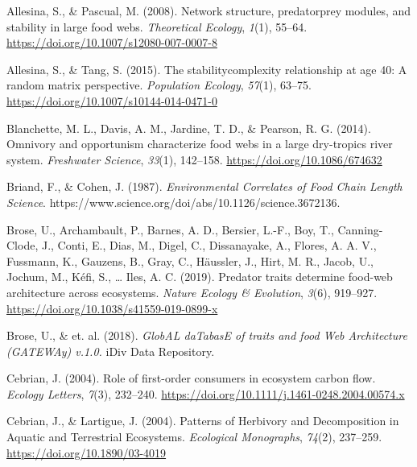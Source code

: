 \documentclass[
]{article}
\newlength{\cslhangindent}
\newlength{\cslentryspacingunit} %
\newenvironment{CSLReferences}[2] %
 {%
  \setlength{\parindent}{0pt}
  \ifodd #1
  \let\oldpar\par
  \def\par{\hangindent=\cslhangindent\oldpar}
  \fi
  \setlength{\parskip}{#2\cslentryspacingunit}
 }%
 {}
\begin{document}
\hypertarget{refs}{}
\begin{CSLReferences}{1}{0}
\leavevmode{}%
Allesina, S., \& Pascual, M. (2008). Network structure,
predator\textendash prey modules, and stability in large food webs.
\emph{Theoretical Ecology}, \emph{1}(1), 55--64.
\url{https://doi.org/10.1007/s12080-007-0007-8}

\leavevmode{}%
Allesina, S., \& Tang, S. (2015). The stability\textendash complexity
relationship at age 40: A random matrix perspective. \emph{Population
Ecology}, \emph{57}(1), 63--75.
\url{https://doi.org/10.1007/s10144-014-0471-0}

\leavevmode{}%
Blanchette, M. L., Davis, A. M., Jardine, T. D., \& Pearson, R. G.
(2014). Omnivory and opportunism characterize food webs in a large
dry-tropics river system. \emph{Freshwater Science}, \emph{33}(1),
142--158. \url{https://doi.org/10.1086/674632}

\leavevmode{}%
Briand, F., \& Cohen, J. (1987). \emph{Environmental {Correlates} of
{Food Chain Length} \textbar{} {Science}}.
https://www.science.org/doi/abs/10.1126/science.3672136.

\leavevmode{}%
Brose, U., Archambault, P., Barnes, A. D., Bersier, L.-F., Boy, T.,
Canning-Clode, J., Conti, E., Dias, M., Digel, C., Dissanayake, A.,
Flores, A. A. V., Fussmann, K., Gauzens, B., Gray, C., Häussler, J.,
Hirt, M. R., Jacob, U., Jochum, M., Kéfi, S., \ldots{} Iles, A. C.
(2019). Predator traits determine food-web architecture across
ecosystems. \emph{Nature Ecology \& Evolution}, \emph{3}(6), 919--927.
\url{https://doi.org/10.1038/s41559-019-0899-x}

\leavevmode{}%
Brose, U., \& et. al. (2018). \emph{{GlobAL daTabasE} of traits and food
{Web Architecture} ({GATEWAy}) v.1.0.} {iDiv Data Repository}.

\leavevmode{}%
Cebrian, J. (2004). Role of first-order consumers in ecosystem carbon
flow. \emph{Ecology Letters}, \emph{7}(3), 232--240.
\url{https://doi.org/10.1111/j.1461-0248.2004.00574.x}

\leavevmode{}%
Cebrian, J., \& Lartigue, J. (2004). Patterns of {Herbivory} and
{Decomposition} in {Aquatic} and {Terrestrial Ecosystems}.
\emph{Ecological Monographs}, \emph{74}(2), 237--259.
\url{https://doi.org/10.1890/03-4019}


\end{CSLReferences}
\end{document}

